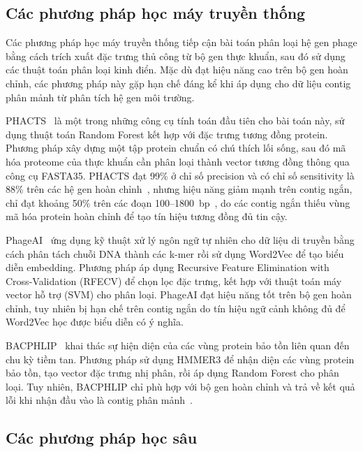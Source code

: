 \subsection{Các phương pháp học máy truyền thống}
\label{subsec:traditional_ml}

Các phương pháp học máy truyền thống tiếp cận bài toán phân loại hệ gen phage bằng cách trích xuất đặc trưng thủ công từ bộ gen thực khuẩn, sau đó sử dụng các thuật toán phân loại kinh điển. Mặc dù đạt hiệu năng cao trên bộ gen hoàn chỉnh, các phương pháp này gặp hạn chế đáng kể khi áp dụng cho dữ liệu contig phân mảnh từ phân tích hệ gen môi trường.

PHACTS~\cite{mcnair2012phacts} là một trong những công cụ tính toán đầu tiên cho bài toán này, sử dụng thuật toán Random Forest kết hợp với đặc trưng tương đồng protein. Phương pháp xây dựng một tập protein chuẩn có chú thích lối sống, sau đó mã hóa proteome của thực khuẩn cần phân loại thành vector tương đồng thông qua công cụ FASTA35. PHACTS đạt 99\% ở chỉ số precision và có chỉ số sensitivity là 88\% trên các hệ gen hoàn chỉnh~\cite{mcnair2012phacts}, nhưng hiệu năng giảm mạnh trên contig ngắn, chỉ đạt khoảng 50\% trên các đoạn 100--1800~bp~\cite{wu2021deephage}, do các contig ngắn thiếu vùng mã hóa protein hoàn chỉnh để tạo tín hiệu tương đồng đủ tin cậy.

PhageAI~\cite{tynecki2020phageai} ứng dụng kỹ thuật xử lý ngôn ngữ tự nhiên cho dữ liệu di truyền bằng cách phân tách chuỗi DNA thành các k-mer rồi sử dụng Word2Vec để tạo biểu diễn embedding. Phương pháp áp dụng Recursive Feature Elimination with Cross-Validation (RFECV) để chọn lọc đặc trưng, kết hợp với thuật toán máy vector hỗ trợ (SVM) cho phân loại. PhageAI đạt hiệu năng tốt trên bộ gen hoàn chỉnh, tuy nhiên bị hạn chế trên contig ngắn do tín hiệu ngữ cảnh không đủ để Word2Vec học được biểu diễn có ý nghĩa.

BACPHLIP~\cite{hockenberry2021bacphlip} khai thác sự hiện diện của các vùng protein bảo tồn liên quan đến chu kỳ tiềm tan. Phương pháp sử dụng HMMER3 để nhận diện các vùng protein bảo tồn, tạo vector đặc trưng nhị phân, rồi áp dụng Random Forest cho phân loại. Tuy nhiên, BACPHLIP chỉ phù hợp với bộ gen hoàn chỉnh và trả về kết quả lỗi khi nhận đầu vào là contig phân mảnh~\cite{shang2023phatyp}.

\subsection{Các phương pháp học sâu}
\label{subsec:deep_learning_methods}


